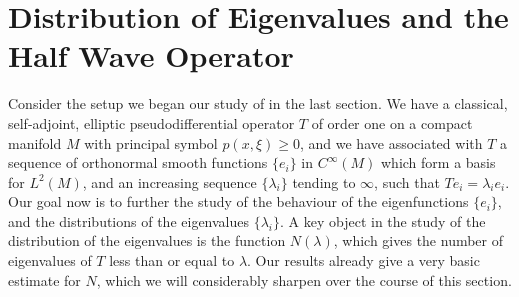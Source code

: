 \section{Distribution of Eigenvalues and the Half Wave Operator}

Consider the setup we began our study of in the last section. We have a classical, self-adjoint, elliptic pseudodifferential operator $T$ of order one on a compact manifold $M$ with principal symbol $p(x,\xi) \geq 0$, and we have associated with $T$ a sequence of orthonormal smooth functions $\{ e_i \}$ in $C^\infty(M)$ which form a basis for $L^2(M)$, and an increasing sequence $\{ \lambda_i \}$ tending to $\infty$, such that $Te_i = \lambda_i e_i$. Our goal now is to further the study of the behaviour of the eigenfunctions $\{ e_i \}$, and the distributions of the eigenvalues $\{ \lambda_i \}$. A key object in the study of the distribution of the eigenvalues is the function $N(\lambda)$, which gives the number of eigenvalues of $T$ less than or equal to $\lambda$. Our results already give a very basic estimate for $N$, which we will considerably sharpen over the course of this section.

